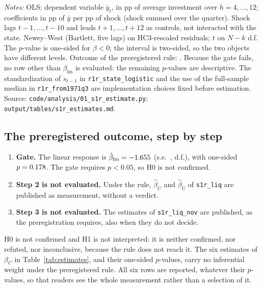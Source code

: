 \documentclass[11pt]{article}
\theoremstyle{remark}
\newcommand{\notewidth}{0.95\textwidth} %
\begin{document}
\begin{table}[t]
\vspace{0.5em}
\begin{minipage}{\notewidth}\footnotesize
\emph{Notes:} OLS; dependent variable $\bar y_t$, in pp of average investment over $h=4,\dots,12$; coefficients in pp of $\bar y$
per pp of shock (shock summed over the quarter). Shock lags $t-1,\dots,t-10$ and leads $t+1,\dots,t+12$ as controls, not interacted
with the state. Newey--West (Bartlett, five lags) on HC3-rescaled residuals; $t$ on $N-k$ d.f. The $p$-value is one-sided for
$\beta<0$; the interval is two-sided, so the two objects have different levels. Outcome of the preregistered rule:
\texttt{\verdictoVs}. Because the gate fails, no row other than $\beta_{\text{lin}}$ is evaluated: the remaining $p$-values are
descriptive. The standardization of $s_{t-1}$ in \texttt{r1r\_state\_logistic} and the use of the full-sample median in
\texttt{r1r\_from1971q3} are implementation choices fixed before estimation. Source: \texttt{code/analysis/01\_s1r\_estimate.py}; \texttt{output/tables/s1r\_estimates.md}.
\end{minipage}
\end{table}

\subsection{The preregistered outcome, step by step}

\begin{enumerate}
\item \textbf{Gate.} The linear response is $\hat\beta_{\text{lin}}=-1.655$ (s.e.\ \bLinSe, \bLinDof{} d.f.), with one-sided
$p=0.178$. The gate requires $p<0.05$, so H0 is not confirmed. %
\item \textbf{Step 2 is not evaluated.} Under the rule, $\hat\beta_C$ and $\hat\beta_U$ of \texttt{s1r\_liq} are published as
measurement, without a verdict.
\item \textbf{Step 3 is not evaluated.} The estimates of \texttt{s1r\_liq\_nov} are published, as the preregistration requires,
also when they do not decide.
\end{enumerate}

H0 is not confirmed and H1 is not interpreted: it is neither confirmed, nor refuted, nor inconclusive, because the rule does not
reach it. The six estimates of $\beta_C$ in Table~\ref{tab:estimates}, and their one-sided $p$-values, carry no inferential
weight under the preregistered rule. All six rows are reported, whatever their $p$-values, so that readers see the whole
measurement rather than a selection of it.
\end{document}
